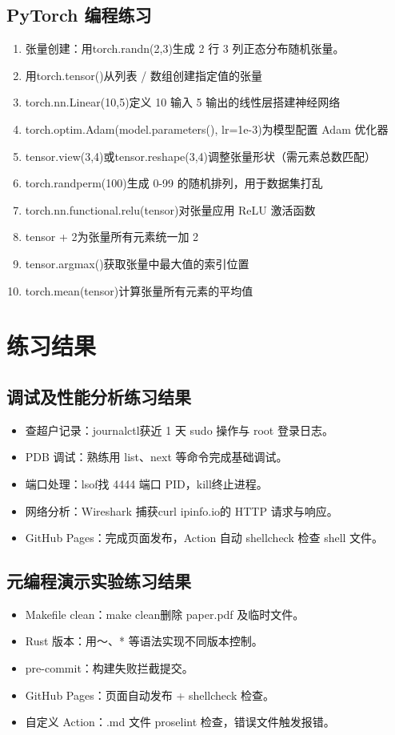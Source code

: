 \documentclass[10.5pt]{ctexart}
\begin{document}
\subsection{PyTorch 编程练习}
\begin{enumerate}
    \item 张量创建：用torch.randn(2,3)生成 2 行 3 列正态分布随机张量。
    \item 用torch.tensor()从列表 / 数组创建指定值的张量
    \item torch.nn.Linear(10,5)定义 10 输入 5 输出的线性层搭建神经网络
    \item torch.optim.Adam(model.parameters(), lr=1e-3)为模型配置 Adam 优化器
    \item tensor.view(3,4)或tensor.reshape(3,4)调整张量形状（需元素总数匹配）
    \item torch.randperm(100)生成 0-99 的随机排列，用于数据集打乱
    \item torch.nn.functional.relu(tensor)对张量应用 ReLU 激活函数
    \item tensor + 2为张量所有元素统一加 2
    \item tensor.argmax()获取张量中最大值的索引位置
    \item torch.mean(tensor)计算张量所有元素的平均值
    
\end{enumerate}

\section{练习结果}
\subsection{调试及性能分析练习结果}
\begin{itemize}
\item 查超户记录：journalctl获近 1 天 sudo 操作与 root 登录日志。
\item PDB 调试：熟练用 list、next 等命令完成基础调试。
\item 端口处理：lsof找 4444 端口 PID，kill终止进程。
\item 网络分析：Wireshark 捕获curl ipinfo.io的 HTTP 请求与响应。
\item GitHub Pages：完成页面发布，Action 自动 shellcheck 检查 shell 文件。
\end{itemize}

\subsection{元编程演示实验练习结果}
\begin{itemize}
\item Makefile clean：make clean删除 paper.pdf 及临时文件。
\item Rust 版本：用～、* 等语法实现不同版本控制。
\item pre-commit：构建失败拦截提交。
\item GitHub Pages：页面自动发布 + shellcheck 检查。
\item 自定义 Action：.md 文件 proselint 检查，错误文件触发报错。
\end{itemize}
\end{document}
